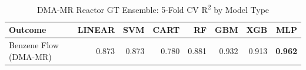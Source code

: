 \begin{table}[ht]
\centering
\caption{DMA-MR Reactor GT Ensemble: 5-Fold CV R\textsuperscript{2} by Model Type}
\begin{tabular}{lrrrrrrr}
\toprule
Outcome & LINEAR & SVM & CART & RF & GBM & XGB & MLP \\
\midrule
Benzene Flow (DMA-MR) & 0.873 & 0.873 & 0.780 & 0.881 & 0.932 & 0.913 & \textbf{0.962} \\
\bottomrule
\end{tabular}
\end{table}